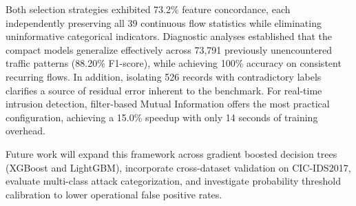 \documentclass[conference]{IEEEtran}
\begin{document}
Both selection strategies exhibited 73.2\% feature concordance, each independently preserving all 39 continuous flow statistics while eliminating uninformative categorical indicators. Diagnostic analyses established that the compact models generalize effectively across 73,791 previously unencountered traffic patterns (88.20\% F1-score), while achieving 100\% accuracy on consistent recurring flows. In addition, isolating 526 records with contradictory labels clarifies a source of residual error inherent to the benchmark. For real-time intrusion detection, filter-based Mutual Information offers the most practical configuration, achieving a 15.0\% speedup with only 14 seconds of training overhead.

Future work will expand this framework across gradient boosted decision trees (XGBoost and LightGBM), incorporate cross-dataset validation on CIC-IDS2017, evaluate multi-class attack categorization, and investigate probability threshold calibration to lower operational false positive rates.
\end{document}
